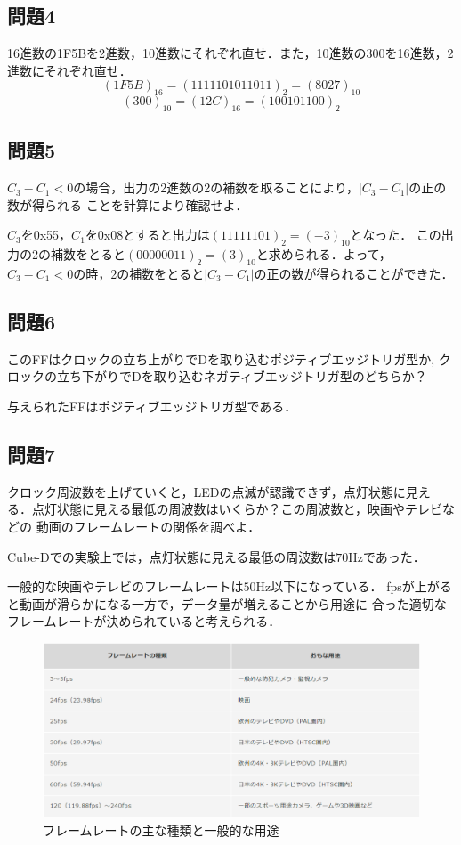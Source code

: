 \subsection*{問題4}
16進数の1F5Bを2進数，10進数にそれぞれ直せ．また，10進数の300を16進数，2進数にそれぞれ直せ．
$$
(1F5B)_{16}=(1111101011011)_2=(8027)_{10}
$$
$$
(300)_{10}=(12C)_{16}=(100101100)_2
$$

\subsection*{問題5}
$C_3-C_1<0$の場合，出力の2進数の2の補数を取ることにより，$|C_3-C_1|$の正の数が得られる
ことを計算により確認せよ．

$C_3$を0x55，$C_1$を0x08とすると出力は$(11111101)_2=(-3)_{10}$となった．
この出力の2の補数をとると$(00000011)_2=(3)_{10}$と求められる．よって，
$C_3-C_1<0$の時，2の補数をとると$|C_3-C_1|$の正の数が得られることができた．

\subsection*{問題6}
このFFはクロックの立ち上がりでDを取り込むポジティブエッジトリガ型か,
クロックの立ち下がりでDを取り込むネガティブエッジトリガ型のどちらか？

与えられたFFはポジティブエッジトリガ型である．

\subsection*{問題7}
クロック周波数を上げていくと，LEDの点滅が認識できず，点灯状態に見え
る．点灯状態に見える最低の周波数はいくらか？この周波数と，映画やテレビなどの
動画のフレームレートの関係を調べよ．

Cube-Dでの実験上では，点灯状態に見える最低の周波数は$70\mathrm{Hz}$であった．

一般的な映画やテレビのフレームレートは$50\mathrm{Hz}$以下になっている．
fpsが上がると動画が滑らかになる一方で，データ量が増えることから用途に
合った適切なフレームレートが決められていると考えられる．
\begin{figure}[H]
    \centering
    \caption{フレームレートの主な種類と一般的な用途}
    \includegraphics[scale=0.5]{figure2.pdf}
\end{figure} 


